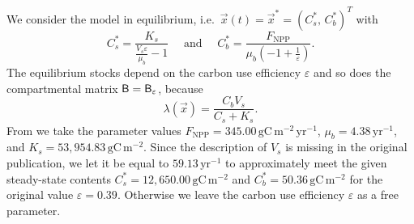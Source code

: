 \documentclass[smallextended]{svjour3}
\newcommand{\gC}{\mathrm{gC}}
\newcommand{\yr}{\mathrm{yr}}
\newcommand{\meter}{\mathrm{m}}
\newcommand{\ie}{i.e.}
\newcommand{\NPP}{\ensuremath{\mathrm{NPP}}}
\begin{document}
We consider the model in equilibrium, \ie\ $\vec{x}(t)=\vec{x}^\ast=(C_s^\ast,\,C_b^\ast)^T$ with
\begin{equation*}
  C_s^\ast = \frac{K_{s}}{\frac{V_{s} \varepsilon}{\mu_{b}} - 1}\quad\text{ and }\quad C_b^\ast = \frac{F_{\NPP}}{\mu_{b} \left(-1 + \frac{1}{\varepsilon}\right)}.
\end{equation*}
The equilibrium stocks depend on the carbon use efficiency $\varepsilon$ and so does the compartmental matrix $\mathsf{B}=\mathsf{B}_\varepsilon$, because
\begin{equation}\label{eqn:lambdax}
    \lambda(\vec{x}) = \frac{C_{b} V_{s}}{C_{s} + K_{s}}.
\end{equation}
From \citet{Wang2014BG} we take the parameter values $F_{\NPP} = 345.00\,\gC\,\meter^{-2}\,\yr^{-1}$, $\mu_b = 4.38\,\yr^{-1}$, and $K_s = 53,954.83\,\gC\,\meter^{-2}$.
Since the description of $V_s$ is missing in the original publication, we let it be equal to $59.13\,\yr^{-1}$ to approximately meet the given steady-state contents $C_s^\ast = 12,650.00\,\gC\,\meter^{-2}$ and $C_b^\ast = 50.36\,\gC\,\meter^{-2}$ for the original value $\varepsilon=0.39$.
Otherwise we leave the carbon use efficiency $\varepsilon$ as a free parameter.
\end{document}
